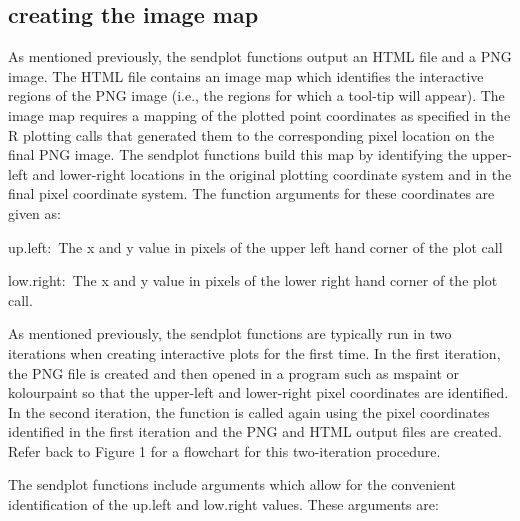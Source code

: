 \documentclass[]{article}
\begin{document}
\subsection{creating the image map}

As mentioned previously, the sendplot functions output an HTML file and a PNG image. The HTML file contains an image map which identifies the interactive regions of the PNG image (i.e., the regions for which a tool-tip will appear). The image map requires a mapping of the plotted point coordinates as specified in the R plotting calls that generated them to the corresponding pixel location on the final PNG image. The sendplot functions build this map by identifying the upper-left and lower-right locations in the original plotting coordinate system and in the final pixel coordinate system. The function arguments for these coordinates are given as:
\begin{description}
  \item{up.left:~}{The x and y value in pixels of the upper left hand
    corner of the plot call}
  \item{low.right:~}{The x and y value in pixels of the lower right hand
    corner of the plot call.}
\end{description}

\indent As mentioned previously, the sendplot functions are typically run in two iterations when creating interactive plots for the first time. In the first iteration, the PNG file is created and then opened in a program such as mspaint or kolourpaint so that the upper-left and lower-right pixel coordinates are identified. In the second iteration, the function is called again using the pixel coordinates identified in the first iteration and the PNG and HTML output files are created.  Refer back to Figure 1 for a flowchart for this two-iteration procedure. 


\indent The sendplot functions  include arguments which allow for the convenient identification of the up.left and low.right values. These arguments are:
\end{document}
